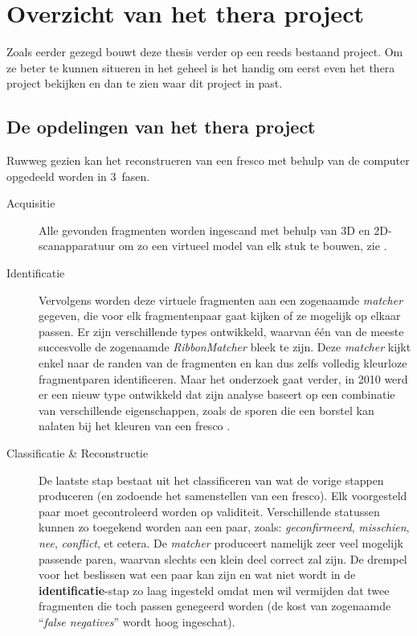 \chapter{Overzicht van het thera project}
\label{hoofdstuk:overzicht}
Zoals eerder gezegd bouwt deze thesis verder op een reeds bestaand project. Om ze beter te kunnen situeren in het geheel is het handig om eerst even het thera project bekijken
en dan te zien waar dit project in past.

\section{De opdelingen van het thera project}
Ruwweg gezien kan het reconstrueren van een fresco met behulp van de computer opgedeeld worden in 3~fasen.

\begin{description}
	\item[Acquisitie] Alle gevonden fragmenten worden ingescand met behulp van 3D en 2D-scanapparatuur om zo een virtueel model van elk stuk te bouwen, zie \cite{Brown2008}.  
	\item[Identificatie] Vervolgens worden deze virtuele fragmenten aan een zogenaamde \emph{matcher} gegeven, die voor elk fragmentenpaar gaat kijken of ze mogelijk op elkaar passen. Er zijn verschillende types ontwikkeld, waarvan \'e\'en van de meeste succesvolle de zogenaamde \emph{RibbonMatcher} \cite{Brown2008} bleek te zijn. Deze \emph{matcher} kijkt enkel naar de randen van de fragmenten en kan dus zelfs volledig kleurloze fragmentparen identificeren. Maar het onderzoek gaat verder, in 2010 werd er een nieuw type ontwikkeld dat zijn analyse baseert op een combinatie van verschillende eigenschappen, zoals de sporen die een borstel kan nalaten bij het kleuren van een fresco \cite{TolerFranklin2010}.
	\item[Classificatie \& Reconstructie] De laatste stap bestaat uit het classificeren van wat de vorige stappen produceren (en zodoende het samenstellen van een fresco). Elk voorgesteld paar moet gecontroleerd worden op validiteit. Verschillende statussen kunnen zo toegekend worden aan
	een paar, zoals: \emph{geconfirmeerd}, \emph{misschien}, \emph{nee}, \emph{conflict}, et cetera. De \emph{matcher} produceert namelijk zeer veel mogelijk passende paren, waarvan slechts een klein deel correct zal zijn. De drempel voor het beslissen wat een paar kan zijn en wat niet wordt in de \textbf{identificatie}-stap zo laag ingesteld omdat men wil vermijden dat twee fragmenten die toch passen genegeerd worden (de kost van zogenaamde ``\emph{false negatives}'' wordt hoog ingeschat).
\end{description}

